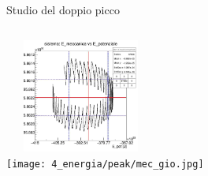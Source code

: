         \begin{frame}{Studio del doppio picco}
            \begin{columns}
                    \centering        
                    \includegraphics[width=5cm,height=3.75cm]{4_energia/peak/Mec_pot.jpg}\\
                    \label{cfr::E4T}              
                    \centering        
                    \texttt{[image: 4\_energia/peak/mec\_gio.jpg]}\\
                    \label{cfr::E6T}      
            \end{columns}
        \end{frame}

